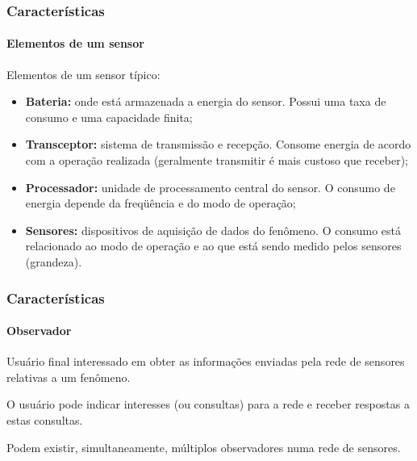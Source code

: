 \documentclass[notes]{beamer}
\begin{document}
\begin{frame}
\frametitle{Características}
\framesubtitle{Elementos de um sensor}

\begin{block}

Elementos de um sensor típico: \pause

\begin{itemize}

\item \textbf{Bateria:} onde está armazenada a energia do sensor. Possui uma taxa de consumo e uma capacidade finita; \pause

\item \textbf{Transceptor:} sistema de transmissão e recepção. Consome energia de acordo com a operação realizada (geralmente transmitir é mais custoso que receber); \pause

\item \textbf{Processador:} unidade de processamento central do sensor. O consumo de energia depende da freqüência e do modo de operação; \pause

\item \textbf{Sensores:} dispositivos de aquisição de dados do fenômeno. O consumo está relacionado ao modo de operação e ao que está sendo medido pelos sensores (grandeza). 

\end{itemize}

\end{block}

\end{frame}

\begin{frame}
\frametitle{Características}
\framesubtitle{Observador}

\begin{block}

Usuário final interessado em obter as informações enviadas pela rede de sensores relativas a um fenômeno. 
\end{block}

\begin{block}

O usuário pode indicar interesses (ou consultas) para a rede e receber respostas a estas consultas. 
\end{block}

\begin{block}

Podem existir, simultaneamente, múltiplos observadores numa rede de sensores.
\end{block}

\end{frame}
\end{document}
